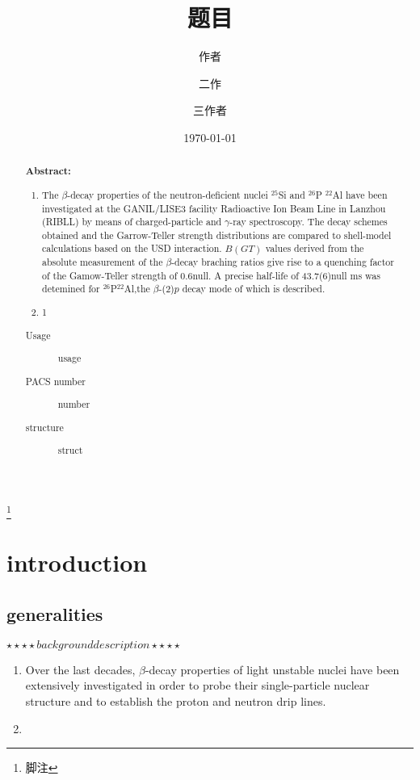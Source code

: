 \documentclass[UTF8]{ctexart}
\begin{document}
\title{题目}
\thanks{脚注}
\author{作者}
\author{二作}   
\author{三作者}
\date{\today}

\begin{abstract}
    \textbf{Abstract:}
    \begin{enumerate}
        \item The $\beta$-decay properties of the neutron-deficient nuclei {\color{red}$^{25}$Si and $^{26}$P} {\color{blue}$^{22}$Al} have been investigated at {\color{red}the GANIL/LISE3 facility} {\color{blue}Radioactive Ion Beam Line in Lanzhou (RIBLL)} by means of charged-particle and $\gamma$-ray spectroscopy. The decay schemes obtained and the Garrow-Teller strength distributions are compared to shell-model calculations based on the USD interaction. $B(GT)$ values derived from the absolute measurement of the $\beta$-decay braching ratios give rise to a quenching factor of the Gamow-Teller strength of {\color{red}0.6}{\color{blue}null}. A precise half-life of {\color{red}43.7(6)}{\color{blue}null} ms was detemined for {\color{red}$^{26}$P}{\color{blue}$^{22}$Al},the $\beta$-(2)$p$ decay mode of which is described.
        \item 1
    \end{enumerate}

    \begin{description}
        \item[Usage] usage
        \item[PACS number] number
        \item[structure]   struct
    \end{description}
\end{abstract}

\maketitle

\section{introduction}
\subsection{generalities}
$\star\star\star\star  background description  \star\star\star\star$
\begin{enumerate}
    \item Over the last decades, $\beta$-decay properties of light unstable nuclei have been extensively investigated in order to probe their single-particle nuclear structure and to establish the proton and neutron drip lines.
    \item 
\end{enumerate}
\end{document}
